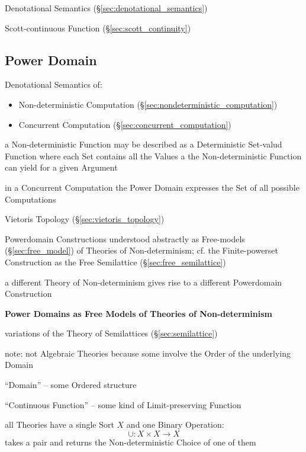 Denotational Semantics (\S\ref{sec:denotational_semantics})

Scott-continuous Function (\S\ref{sec:scott_continuity})



\subsection{Power Domain}\label{sec:power_domain}

Denotational Semantics of:
\begin{itemize}
  \item Non-deterministic Computation
    (\S\ref{sec:nondeterministic_computation})
  \item Concurrent Computation (\S\ref{sec:concurrent_computation})
\end{itemize}

a Non-deterministic Function may be described as a Deterministic
Set-valud Function where each Set contains all the Values a the
Non-deterministic Function can yield for a given Argument

in a Concurrent Computation the Power Domain expresses the Set of all
possible Computations

\fist Vietoris Topology (\S\ref{sec:vietoris_topology})

Powerdomain Constructions understood abstractly as Free-models
(\S\ref{sec:free_model}) of Theories of Non-determinism; cf. the
Finite-powerset Construction as the Free Semilattice
(\S\ref{sec:free_semilattice})

a different Theory of Non-determinism gives rise to a different
Powerdomain Construction


\textbf{Power Domains as Free Models of Theories of Non-determinism}

variations of the Theory of Semilattices (\S\ref{sec:semilattice})

\fist note: not Algebraic Theories because some involve the Order of
the underlying Domain %

``Domain'' -- some Ordered structure

``Continuous Function'' -- some kind of Limit-preserving Function

all Theories have a single Sort $X$ and one Binary Operation:
\[
  \cup : X \times X \rightarrow X
\]
takes a pair and returns the Non-deterministic Choice of one of them

